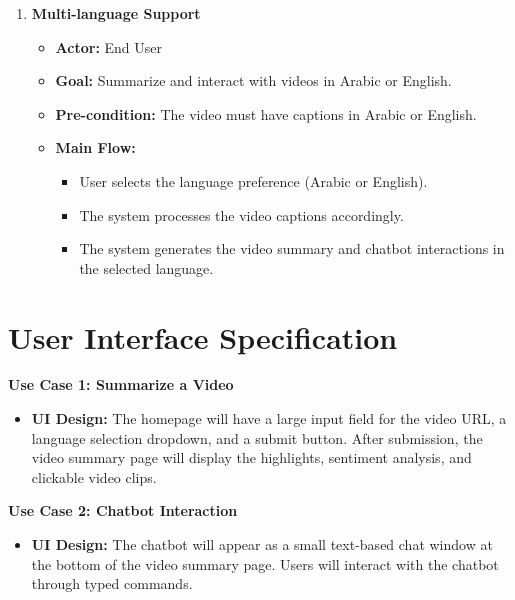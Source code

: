 \documentclass{bscs}
\begin{document}
\begin{enumerate}
\begin{itemize}
\end{itemize}


\item \textbf{Multi-language Support}  

\begin{itemize}
    \item \textbf{Actor:}  End User
    \item \textbf{Goal:} Summarize and interact with videos in Arabic or English. 
    
    \item \textbf{Pre-condition:} The video must have captions in Arabic or English.

    \item \textbf{Main Flow:} 
        \begin{itemize}
        \item User selects the language preference (Arabic or English).
        \item The system processes the video captions accordingly.
        \item The system generates the video summary and chatbot interactions in the selected language.
    \end{itemize}    
\end{itemize}

\end{enumerate}

\chapter{User Interface Specification}

\item \textbf{Use Case 1: Summarize a Video}
    \begin{itemize}
        \item \textbf {UI Design:} The homepage will have a large input field for the video URL, a language selection dropdown, and a submit button. After submission, the video summary page will display the highlights, sentiment analysis, and clickable video clips.
    \end{itemize}

\item \textbf{Use Case 2: Chatbot Interaction}
    \begin{itemize}
        \item \textbf {UI Design:} The chatbot will appear as a small text-based chat window at the bottom of the video summary page. Users will interact with the chatbot through typed commands.
    \end{itemize}
\end{document}

